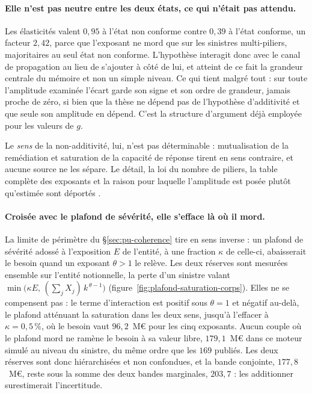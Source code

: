 \paragraph{Elle n'est pas neutre entre les deux états, ce qui n'était pas attendu.} Les élasticités
valent $0{,}95$ à l'état non conforme contre $0{,}39$ à l'état conforme, un facteur $2{,}42$, parce
que l'exposant ne mord que sur les sinistres multi-piliers, majoritaires au seul état non conforme.
L'hypothèse interagit donc avec le canal de propagation au lieu de s'ajouter à côté de lui,
et atteint de ce fait la grandeur centrale du mémoire et non un simple niveau. Ce qui tient malgré
tout : sur toute l'amplitude examinée l'écart garde son signe et son ordre de grandeur, jamais
proche de zéro, si bien que la thèse ne dépend pas de l'hypothèse d'additivité et que seule son
amplitude en dépend. C'est la structure d'argument déjà employée pour les valeurs de $g$.

Le \emph{sens} de la non-additivité, lui, n'est pas déterminable : mutualisation de la remédiation
et saturation de la capacité de réponse tirent en sens contraire, et aucune source ne les sépare. Le
détail, la loi du nombre de piliers, la table complète des exposants et la raison pour laquelle
l'amplitude est posée plutôt qu'estimée sont déportés \matcomp.

\paragraph{Croisée avec le plafond de sévérité, elle s'efface là où il mord.} La limite de
périmètre du \S\ref{sec:pu-coherence} tire en sens inverse : un plafond de sévérité adossé à
l'exposition $E$ de l'entité, à une fraction $\kappa$ de celle-ci, abaisserait le besoin quand un
exposant $\theta > 1$ le relève. Les deux réserves sont mesurées ensemble sur l'entité notionnelle,
la perte d'un sinistre valant $\min\bigl(\kappa E,\,(\sum_j X_j)\,k^{\,\theta-1}\bigr)$
(figure~\ref{fig:plafond-saturation-corps}). Elles ne se compensent pas : le terme d'interaction est
positif sous $\theta = 1$ et négatif au-delà, le plafond atténuant la saturation dans les deux sens,
jusqu'à l'effacer à $\kappa = 0{,}5\,\%$, où le besoin vaut $96{,}2$~M\euro{} pour les cinq
exposants. Aucun couple où le plafond mord ne ramène le besoin à sa valeur libre, $179{,}1$~M\euro{}
dans ce moteur simulé au niveau du sinistre, du même ordre que les $169$ publiés. Les deux réserves sont donc hiérarchisées et non confondues, et la bande
conjointe, $177{,}8$~M\euro{}, reste sous la somme des deux bandes marginales, $203{,}7$ : les
additionner surestimerait l'incertitude.

